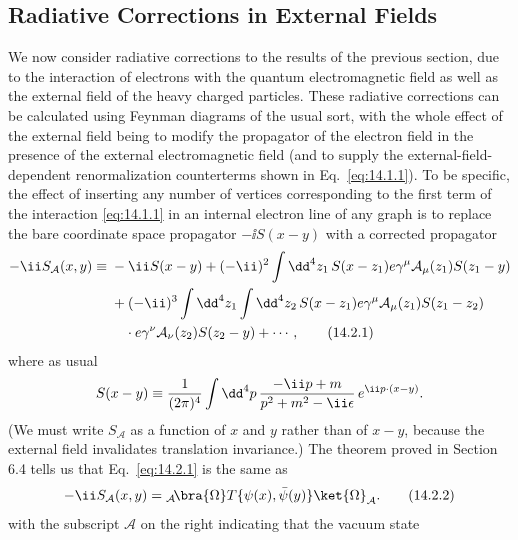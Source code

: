 
\subsection{Radiative Corrections in External Fields}

We now consider radiative corrections to the results of the previous section,
due to the interaction of electrons with the quantum electromagnetic field
as well as the external field of the heavy charged particles. These radiative
corrections can be calculated using Feynman diagrams of the usual sort,
with the whole effect of the external field being to modify the propagator
of the electron field in the presence of the external electromagnetic field
(and to supply the external-field-dependent renormalization counterterms
shown in Eq.~\eqref{eq:14.1.1}). To be specific, the effect of inserting any number
of vertices corresponding to the first term of the interaction \eqref{eq:14.1.1} in an
internal electron line of any graph is to replace the bare coordinate space
propagator $-\ii S(x-y)$ with a corrected propagator
\begin{align}
 -\ii S_{\mathcal A}(x,y)\equiv{}&-\ii S(x-y)
 +(-\ii)^2\int \dd^4z_1\,S(x-z_1)e\gamma^\mu\mathcal A_\mu(z_1)S(z_1-y)
 \notag\\
 &+(-\ii)^3\int \dd^4z_1\int \dd^4z_2\,
 S(x-z_1)e\gamma^\mu\mathcal A_\mu(z_1)S(z_1-z_2)
 \notag\\
 &\quad\cdot e\gamma^\nu\mathcal A_\nu(z_2)S(z_2-y)+\cdots ,
 \tag{14.2.1}\label{eq:14.2.1}
\end{align}
where as usual
\[
 S(x-y)\equiv\frac{1}{(2\pi)^4}\int \dd^4p\,
 \frac{-\ii\sl{p}+m}{p^2+m^2-\ii\epsilon}\,e^{\ii p\cdot(x-y)}.
\]
(We must write $S_{\mathcal A}$ as a function of $x$ and $y$ rather than of
$x-y$, because the external field invalidates translation invariance.) The
theorem proved in Section 6.4 tells us that Eq.~\eqref{eq:14.2.1} is the same as
\begin{equation}
 -\ii S_{\mathcal A}(x,y)
 ={}_{\mathcal A}\!\bra{\Omega}T\{\psi(x),\bar\psi(y)\}\ket{\Omega}_{\mathcal A}.
 \tag{14.2.2}\label{eq:14.2.2}
\end{equation}
with the subscript $\mathcal A$ on the right indicating that the vacuum state
